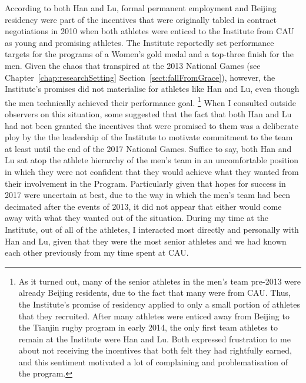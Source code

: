 \begin{CJK}{UTF8}{gbsn}
According to both Han and Lu, formal permanent employment and Beijing residency were part of the incentives that were originally tabled in contract negotiations in 2010 when both athletes were enticed to the Institute from CAU as young and promising athletes.  The Institute reportedly set performance targets for the programs of a Women's gold medal and a top-three finish for the men.  Given the chaos that transpired at the 2013 National Games (see Chapter~\ref{chap:researchSetting} Section~\ref{sect:fallFromGrace}), however, the Institute's promises did not materialise for athletes like Han and Lu, even though the men technically achieved their performance goal.
    \footnote{As it turned out, many of the senior athletes in the men's team pre-2013 were already Beijing residents, due to the fact that many were from CAU.  Thus, the Institute's promise of residency applied to only a small portion of athletes that they recruited.  After many athletes were enticed away from Beijing to the Tianjin rugby program in early 2014, the only first team athletes to remain at the Institute were Han and Lu.  Both expressed frustration to me about not receiving the incentives that both felt they had rightfully earned, and this sentiment motivated a lot of complaining and problematisation of the program.}
When I consulted outside observers on this situation, some suggested that the fact that both Han and Lu had not been granted the incentives that were promised to them was a deliberate ploy by the the leadership of the Institute to motivate commitment to the team at least until the end of the 2017 National Games.  Suffice to say, both Han and Lu sat atop the athlete hierarchy of the men's team in an uncomfortable position in which they were not confident that they would achieve what they wanted from their involvement in the Program.  Particularly given that hopes for success in 2017 were uncertain at best, due to the way in which the men's team had been decimated after the events of 2013, it did not appear that either would come away with what they wanted out of the situation.  During my time at the Institute, out of all of the athletes, I interacted most directly and personally with Han and Lu, given that they were the most senior athletes and we had known each other previously from my time spent at CAU.


\end{CJK}
